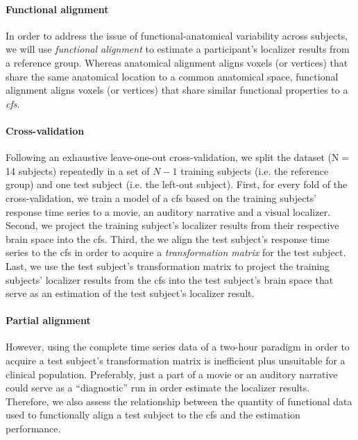\paragraph{Functional alignment}


In order to address the issue of functional-anatomical variability across
subjects, we will use \textit{functional alignment} \citep[cf.][for
reviews]{haxby2020hyperalignment, bazeille2021empirical} to estimate a
participant's localizer results from a reference group.
%
Whereas anatomical alignment aligns voxels (or vertices) that share the same
anatomical location to a common anatomical space, functional alignment aligns
voxels (or vertices) that share similar functional properties to a
\textit{\ac{cfs}}.


\paragraph{Cross-validation}


%
Following an exhaustive leave-one-out cross-validation, we split the dataset
(N$=$14 subjects) repeatedly in a set of $N-1$ training subjects (i.e. the
reference group) and one test subject (i.e. the left-out subject).
%
First, for every fold of the cross-validation, we train a model of a \ac{cfs}
based on the training subjects' response time series to a movie, an auditory
narrative and a visual localizer.
%
Second, we project the training subject's localizer results from their
respective brain space into the \ac{cfs}.
%
Third, the we align the test subject's response time series to the \ac{cfs} in
order to acquire a \textit{transformation matrix} for the test subject.
%
Last, we use the test subject's transformation matrix to project the training
subjects' localizer results from the \ac{cfs} into the test subject's brain
space that serve as an estimation of the test subject's localizer result.

\paragraph{Partial alignment}
However, using the complete time series data of a two-hour paradigm in order to
acquire a test subject's transformation matrix is inefficient plus unsuitable
for a clinical population.
%
Preferably, just a part of a movie or an auditory narrative could serve as a
``diagnostic'' run in order estimate the localizer results.
%
Therefore, we also assess the relationship between the quantity of functional
data used to functionally align a test subject to the \ac{cfs} and the
estimation performance.


